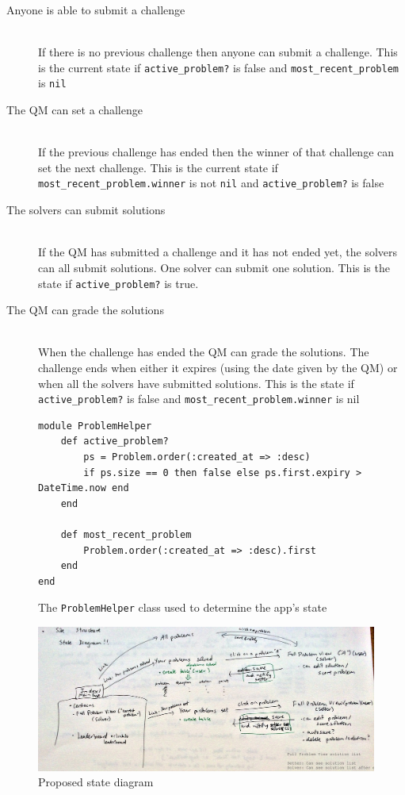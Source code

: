 \documentclass{report}
\begin{document}
\begin{description}
  \item[Anyone is able to submit a challenge] \hfill \\ If there is no previous challenge then anyone can submit a challenge. This is the current state if \texttt{active\_problem?} is false and \texttt{most\_recent\_problem} is \texttt{nil}
  \item[The QM can set a challenge] \hfill \\ If the previous challenge has ended then the winner of that challenge can set the next challenge. This is the current state if \texttt{most\_recent\_problem.winner} is not \texttt{nil} and \texttt{active\_problem?} is false
  \item[The solvers can submit solutions] \hfill \\ If the QM has submitted a challenge and it has not ended yet, the solvers can all submit solutions. One solver can submit one solution. This is the state if \texttt{active\_problem?} is true.
  \item[The QM can grade the solutions] \hfill \\ When the challenge has ended the QM can grade the solutions. The challenge ends when either it expires (using the date given by the QM) or when all the solvers have submitted solutions. This is the state if \texttt{active\_problem?} is false and \texttt{most\_recent\_problem.winner} is nil
\end{description}

\begin{figure}[h]
\begin{verbatim}
module ProblemHelper
    def active_problem?
        ps = Problem.order(:created_at => :desc)
        if ps.size == 0 then false else ps.first.expiry > DateTime.now end
    end

    def most_recent_problem
        Problem.order(:created_at => :desc).first
    end
end
\end{verbatim}
\caption{The \texttt{ProblemHelper} class used to determine the app's state}
\end{figure}

\begin{figure}[H]
\includegraphics[width=\textwidth]{structure}
\caption{Proposed state diagram}
\end{figure}
\end{document}

